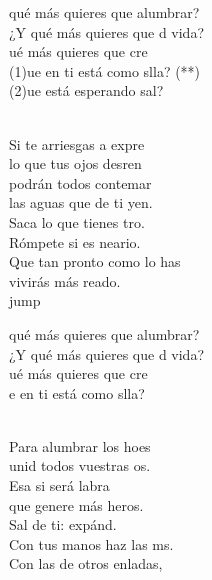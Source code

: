 \begin{cancion}%
	\begin{chorus}%
	 qué más quieres que alumbrar?\\
	¿Y qué más quieres que d vida?\\
	ué más quieres que cre \\
	(1)ue en ti está como slla? (**)\\
	(2)ue está esperando sal?\\
	\end{chorus}%
	\jump\\
	Si te arriesgas a expre \\
	lo que tus ojos desren\\
	podrán todos contemar\\
	las aguas que de ti yen.\\
	Saca lo que tienes tro. \\
	Rómpete si es neario.\\
	Que tan pronto como lo has \\
	vivirás más reado.\\jump\\
	\begin{chorus}%
	 qué más quieres que alumbrar?\\
	¿Y qué más quieres que d vida?\\
	ué más quieres que cre \\
	e en ti está como slla?\\
	\end{chorus}%
	\jump\\
	Para alumbrar los hoes \\
	unid todos vuestras os.\\
	Esa si será labra\\
	que genere más heros.\\
	Sal de ti: expánd. \\
	Con tus manos haz las ms.\\
	Con las de otros enladas,\\

\end{cancion}
